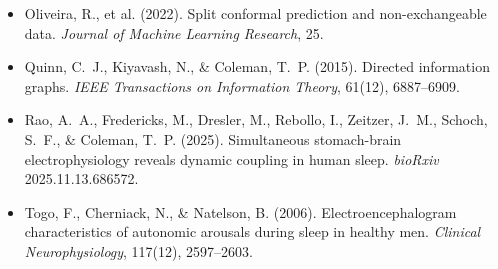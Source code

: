 \documentclass[11pt]{article}
\begin{document}
\begin{itemize}[leftmargin=1.2em,label={}]
\item Oliveira, R., et al. (2022). Split conformal prediction and non-exchangeable
data. \emph{Journal of Machine Learning Research}, 25.
\item Quinn, C.~J., Kiyavash, N., \& Coleman, T.~P. (2015). Directed information
graphs. \emph{IEEE Transactions on Information Theory}, 61(12), 6887--6909.
\item Rao, A.~A., Fredericks, M., Dresler, M., Rebollo, I., Zeitzer, J.~M.,
Schoch, S.~F., \& Coleman, T.~P. (2025). Simultaneous stomach-brain
electrophysiology reveals dynamic coupling in human sleep. \emph{bioRxiv}
2025.11.13.686572.
\item Togo, F., Cherniack, N., \& Natelson, B. (2006). Electroencephalogram
characteristics of autonomic arousals during sleep in healthy men.
\emph{Clinical Neurophysiology}, 117(12), 2597--2603.
\end{itemize}
\end{document}
